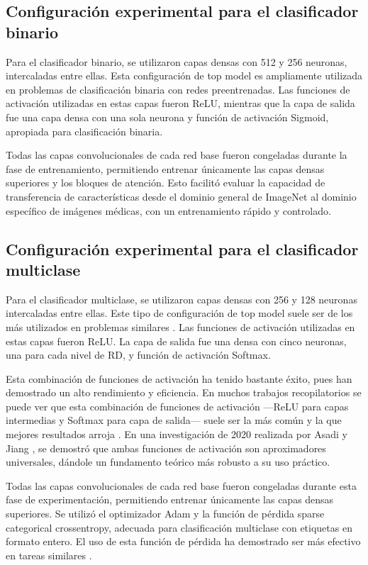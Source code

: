 \subsection{Configuración experimental para el clasificador binario}

Para el clasificador binario, se utilizaron capas densas con 512 y 256 neuronas, intercaladas entre ellas. Esta configuración de top model es ampliamente utilizada en problemas de clasificación binaria con redes preentrenadas. Las funciones de activación utilizadas en estas capas fueron ReLU, mientras que la capa de salida fue una capa densa con una sola neurona y función de activación Sigmoid, apropiada para clasificación binaria.

Todas las capas convolucionales de cada red base fueron congeladas durante la fase de entrenamiento, permitiendo entrenar únicamente las capas densas superiores y los bloques de atención. Esto facilitó evaluar la capacidad de transferencia de características desde el dominio general de ImageNet al dominio específico de imágenes médicas, con un entrenamiento rápido y controlado.

\subsection{Configuración experimental para el clasificador multiclase}

Para el clasificador multiclase, se utilizaron capas densas con 256 y 128 neuronas intercaladas entre ellas. Este tipo de configuración de top model suele ser de los más utilizados en problemas similares . Las funciones de activación utilizadas en estas capas fueron ReLU. La capa de salida fue una densa con cinco neuronas, una para cada nivel de RD, y función de activación Softmax.

Esta combinación de funciones de activación ha tenido bastante éxito, pues han demostrado un alto rendimiento y eficiencia. En muchos trabajos recopilatorios se puede ver que esta combinación de funciones de activación —ReLU para capas intermedias y Softmax para capa de salida— suele ser la más común y la que mejores resultados arroja . En una investigación de 2020 realizada por Asadi y Jiang , se demostró que ambas funciones de activación son aproximadores universales, dándole un fundamento teórico más robusto a su uso práctico.

Todas las capas convolucionales de cada red base fueron congeladas durante esta fase de experimentación, permitiendo entrenar únicamente las capas densas superiores. Se utilizó el optimizador Adam y la función de pérdida sparse categorical crossentropy, adecuada para clasificación multiclase con etiquetas en formato entero. El uso de esta función de pérdida ha demostrado ser más efectivo en tareas similares .

